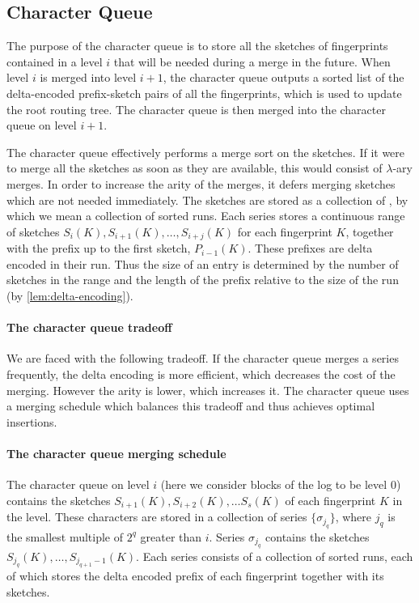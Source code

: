\subsection{Character Queue}\label{sec:character-queue}

The purpose of the character queue is to store all the sketches of fingerprints
contained in a level $i$ that will be needed during a merge in the future.
When level $i$ is merged into level $i+1$, the character queue outputs a sorted
list of the delta-encoded prefix-sketch pairs of all the fingerprints, which is
used to update the root routing tree. The character queue is then merged into
the character queue on level $i+1$.

The character queue effectively performs a merge sort on the sketches. If it
were to merge all the sketches as soon as they are available, this would
consist of $\lambda$-ary merges.  In order to increase the arity of the merges,
it defers merging sketches which are not needed immediately. The sketches are stored
as a collection of , by which we mean a collection of sorted runs. Each
series stores a continuous range of sketches
$S_i(K),S_{i+1}(K),\ldots,S_{i+j}(K)$ for each fingerprint $K$, together with
the prefix up to the first sketch, $P_{i-1}(K)$. These prefixes are delta
encoded in their run. Thus the size of an entry is determined by the number of
sketches in the range and the length of the prefix relative to the size of the
run (by \cref{lem:delta-encoding}).

\paragraph{The character queue tradeoff}
We are faced with the following tradeoff. If the character queue merges a
series frequently, the delta encoding is more efficient, which decreases the
cost of the merging. However the arity is lower, which increases it. The
character queue uses a merging schedule which balances this tradeoff and thus
achieves optimal insertions.

\paragraph{The character queue merging schedule}
The character queue on level $i$ (here we consider blocks of the log to be
level $0$) contains the sketches $S_{i+1}(K), S_{i+2}(K),\ldots S_s(K)$ of each
fingerprint $K$ in the level. These characters are stored in a collection of
series $\{\sigma_{j_q}\}$, where $j_q$ is the smallest multiple of $2^q$
greater than $i$. Series $\sigma_{j_q}$ contains the sketches
$S_{j_q}(K),\ldots,S_{j_{q+1}-1}(K)$. Each series consists of a collection of
sorted runs, each of which stores the delta encoded prefix of each fingerprint
together with its sketches.

